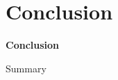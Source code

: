 \section{Conclusion}
\begin{frame}
  {\bf Conclusion}
\end{frame}

\begin{frame}{Summary}

\end{frame}

